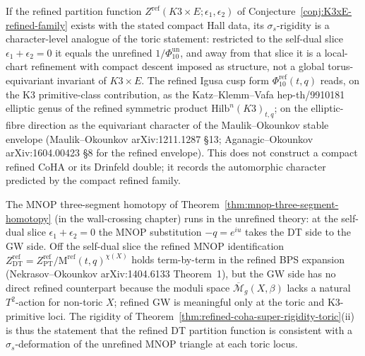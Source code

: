\begin{remark}
\label{rem:refined-partition-K3xE-rigidity}
If the refined partition function
$Z^{\mathrm{ref}}(K3 \times E; \epsilon_1, \epsilon_2)$ of
Conjecture~\ref{conj:K3xE-refined-family} exists with the stated compact
Hall data, its $\sigma_s$-rigidity is a character-level analogue of the
toric statement: restricted to the self-dual slice $\epsilon_1
+ \epsilon_2 = 0$ it equals the unrefined \(1/\Phi_{10}^{\mathrm{un}}\),
and away from that slice it is a local-chart refinement with compact
descent imposed as structure, not a global torus-equivariant invariant
of \(K3\times E\). The
refined Igusa cusp form $\Phi_{10}^{\mathrm{ref}}(t, q)$ reads, on
the K3 primitive-class contribution, as the Katz--Klemm--Vafa
\textup{hep-th/9910181} elliptic genus of the refined symmetric
product $\mathrm{Hilb}^n(K3)_{t, q}$; on the elliptic-fibre direction
as the equivariant character of the Maulik--Okounkov stable envelope
(Maulik--Okounkov \textup{arXiv:1211.1287} \S13;
Aganagic--Okounkov \textup{arXiv:1604.00423} \S8 for the refined
envelope). This does not construct a compact refined CoHA or its
Drinfeld double; it records the automorphic character predicted by the
compact refined family.
\end{remark}

\begin{remark}
\label{rem:mnop-triangle-refined-self-dual}
The MNOP three-segment homotopy of
Theorem~\ref{thm:mnop-three-segment-homotopy} (in the wall-crossing
chapter) runs in the unrefined theory: at the self-dual slice
$\epsilon_1 + \epsilon_2 = 0$ the MNOP substitution $-q = e^{iu}$
takes the DT side to the GW side. Off the self-dual slice the
refined MNOP identification $Z^{\mathrm{ref}}_{\mathrm{DT}} =
Z^{\mathrm{ref}}_{\mathrm{PT}} / \mathrm{M}^{\mathrm{ref}}(t,
q)^{\chi(X)}$ holds term-by-term in the refined BPS expansion (Nekrasov--Okounkov
\textup{arXiv:1404.6133} Theorem~1), but the GW side has no direct
refined counterpart because the moduli space
$\overline{\mathcal{M}}_g(X, \beta)$ lacks a natural $T^{2}$-action
for non-toric $X$; refined GW is meaningful only at the toric and
K3-primitive loci. The rigidity of
Theorem~\ref{thm:refined-coha-super-rigidity-toric}(ii) is thus the
statement that the refined DT partition function is consistent with
a $\sigma_s$-deformation of the unrefined MNOP triangle at each
toric locus.
\end{remark}
